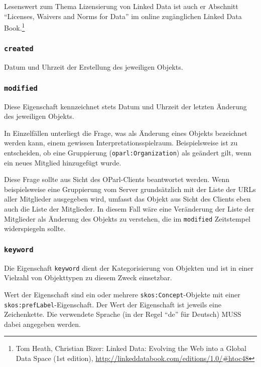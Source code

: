 \documentclass[,a4paper]{article}
\begin{document}
Lesenswert zum Thema Lizensierung von Linked Data ist auch er Abschnitt
``Licenses, Waivers and Norms for Data'' im online zugänglichen Linked
Data Book.\footnote{Tom Heath, Christian Bizer: Linked Data: Evolving
  the Web into a Global Data Space (1st edition),
  \url{http://linkeddatabook.com/editions/1.0/\#htoc48}}

\subsubsection{\texttt{created}}\label{created}

Datum und Uhrzeit der Erstellung des jeweiligen Objekts.

\subsubsection{\texttt{modified}}\label{modified}

Diese Eigenschaft kennzeichnet stets Datum und Uhrzeit der letzten
Änderung des jeweiligen Objekts.

In Einzelfällen unterliegt die Frage, was als Änderung eines Objekts
bezeichnet werden kann, einem gewissen Interpretationsspielraum.
Beispielsweise ist zu entscheiden, ob eine Gruppierung
(\texttt{oparl:Organization}) als geändert gilt, wenn ein neues Mitglied
hinzugefügt wurde.

Diese Frage sollte aus Sicht des OParl-Clients beantwortet werden. Wenn
beispielsweise eine Gruppierung vom Server grundsätzlich mit der Liste
der URLs aller Mitglieder ausgegeben wird, umfasst das Objekt aus Sicht
des Clients eben auch die Liste der Mitglieder. In diesem Fall wäre eine
Veränderung der Liste der Mitglieder als Änderung des Objekts zu
verstehen, die im \texttt{modified} Zeitstempel widerspiegeln sollte.

\subsubsection{\texttt{keyword}}\label{keyword}

Die Eigenschaft \texttt{keyword} dient der Kategorisierung von Objekten
und ist in einer Vielzahl von Objekttypen zu diesem Zweck einsetzbar.

Wert der Eigenschaft sind ein oder mehrere \texttt{skos:Concept}-Objekte
mit einer \texttt{skos:prefLabel}-Eigenschaft. Der Wert der Eigenschaft
ist jeweils eine Zeichenkette. Die verwendete Sprache (in der Regel
``de'' für Deutsch) MUSS dabei angegeben werden.
\end{document}

